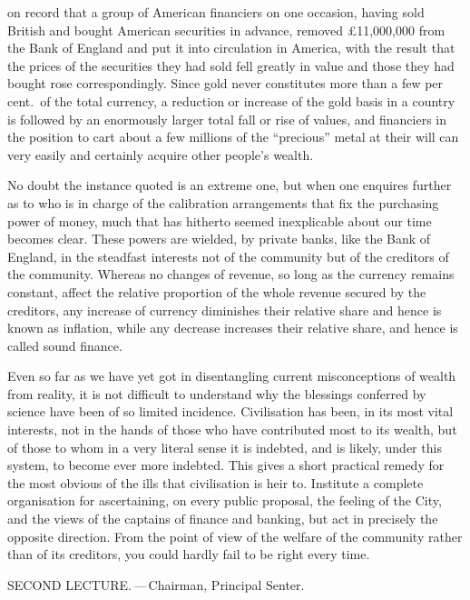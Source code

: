 \documentclass[10.5pt,twoside]{book}
\newcommand{\origpage}[1]{\clearpage\setcounter{page}{#1}}
\begin{document}
\origpage{19}

\noindent on record that a group of American financiers on one occasion,
having sold British and bought American securities in advance, removed
\pounds11,000,000 from the Bank of England and put it into circulation in
America, with the result that the prices of the securities they had sold fell
greatly in value and those they had bought rose correspondingly. Since gold
never constitutes more than a few per cent.\ of the total currency, a
reduction or increase of the gold basis in a country is followed by an
enormously larger total fall or rise of values, and financiers in the position
to cart about a few millions of the ``precious'' metal at their will can very
easily and certainly acquire other people's wealth.

No doubt the instance quoted is an extreme one, but when one enquires further
as to who is in charge of the calibration arrangements that fix the purchasing
power of money, much that has hitherto seemed inexplicable about our time
becomes clear. These powers are wielded, by private banks, like the Bank of
England, in the steadfast interests not of the community but of the creditors
of the community. Whereas no changes of revenue, so long as the currency
remains constant, affect the relative proportion of the whole revenue secured
by the creditors, any increase of currency diminishes their relative share and
hence is known as inflation, while any decrease increases their relative
share, and hence is called sound finance.

Even so far as we have yet got in disentangling current misconceptions of
wealth from reality, it is not difficult to understand why the blessings
conferred by science have been of so limited incidence. Civilisation has been,
in its most vital interests, not in the hands of those who have contributed
most to its wealth, but of those to whom in a very literal sense it is
indebted, and is likely, under this system, to become ever more indebted. This
gives a short practical remedy for the most obvious of the ills that
civilisation is heir to. Institute a complete organisation for ascertaining,
on every public proposal, the feeling of the City, and the views of the
captains of finance and banking, but act in precisely the opposite direction.
From the point of view of the welfare of the community rather than of its
creditors, you could hardly fail to be right every time.

\origpage{20}

\vspace*{4pt}
\begin{center}
  {\footnotesize SECOND LECTURE.\,---\,Chairman, Principal Senter.}
\end{center}
\vspace*{6pt}
\end{document}
